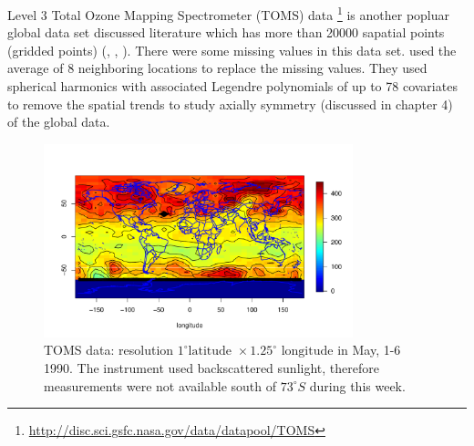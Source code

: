 Level 3 Total Ozone Mapping Spectrometer (TOMS) data \footnote{\url{http://disc.sci.gsfc.nasa.gov/data/datapool/TOMS}} is another popluar global data set discussed literature which has more than 20000 sapatial points (gridded points) (\cite{Stein2007}, \cite{CressieJohannesson2008}, \cite{JunStein2008}). There were some missing values in this data set. \cite{Stein2007} used the average of 8 neighboring locations to replace the missing values. They used spherical harmonics with associated Legendre polynomials of up to 78 covariates to remove the spatial trends to study axially symmetry (discussed in chapter 4) of the global data.


\begin{figure}[H]
\label{TOMS_data}
\centering
\includegraphics [width=0.8\textwidth, keepaspectratio]{graphs/TOMS_data.pdf}
\caption{TOMS data: resolution $1^\circ \mbox{latitude } \times 1.25^\circ \mbox{ longitude}$ in May, 1-6 1990. The instrument used backscattered sunlight, therefore measurements were not available south of $73^\circ S$ during this week.}
\end{figure}

